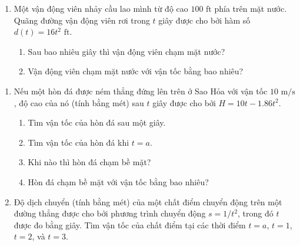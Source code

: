 \begin{minipage}[t]{0.485\textwidth}
\begin{enumerate}[resume*]
    \item Một vận động viên nhảy cầu lao mình từ độ cao $100\text{ ft}$ phía trên mặt nước. Quãng đường vận động viên rơi trong $t$ giây được cho bởi hàm số $d(t) = 16t^2\text{ ft}$.
      \begin{enumerate}[label=(\alph*), leftmargin=1.3em, labelsep=0.35em, itemsep=1.5pt, topsep=1.5pt]
        \item Sau bao nhiêu giây thì vận động viên chạm mặt nước?
        \item Vận động viên chạm mặt nước với vận tốc bằng bao nhiêu?
      \end{enumerate}
  \end{enumerate}
\end{minipage}%
\hfill
\begin{minipage}[t]{0.485\textwidth}
  \begin{enumerate}[label=\textbf{\arabic*.}, leftmargin=1.4em, labelsep=0.4em, itemsep=0.6em, topsep=0pt, parsep=0pt, start=12]
    \item Nếu một hòn đá được ném thẳng đứng lên trên ở Sao Hỏa với vận tốc $10\text{ m/s}$, độ cao của nó (tính bằng mét) sau $t$ giây được cho bởi $H = 10t - 1.86t^2$.
      \begin{enumerate}[label=(\alph*), leftmargin=1.3em, labelsep=0.35em, itemsep=1.5pt, topsep=1.5pt]
        \item Tìm vận tốc của hòn đá sau một giây.
        \item Tìm vận tốc của hòn đá khi $t = a$.
        \item Khi nào thì hòn đá chạm bề mặt?
        \item Hòn đá chạm bề mặt với vận tốc bằng bao nhiêu?
      \end{enumerate}

    \item Độ dịch chuyển (tính bằng mét) của một chất điểm chuyển động trên một đường thẳng được cho bởi phương trình chuyển động $s = 1/t^2$, trong đó $t$ được đo bằng giây. Tìm vận tốc của chất điểm tại các thời điểm $t = a$, $t = 1$, $t = 2$, và $t = 3$.


\end{enumerate}
\end{minipage}
